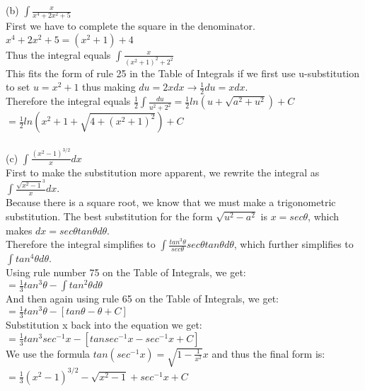\documentclass[11pt, oneside]{article}   	%
\begin{document}
\noindent (b) $\int \frac{x}{x^4 + 2x^2 + 5}$\\
First we have to complete the square in the denominator.\\
$x^4 + 2x^2 + 5 = (x^2 + 1) + 4$\\
Thus the integral equals $\int \frac{x}{(x^2+1)^2 + 2^2}$\\
This fits the form of rule 25 in the Table of Integrals if we first use u-substitution to set $u = x^2 + 1$ thus making $du = 2xdx \rightarrow \frac{1}{2}du = xdx$.\\
Therefore the integral equals $\frac{1}{2} \int \frac{du}{u^2 + 2^2} = \frac{1}{2} ln(u + \sqrt{a^2 + u^2}) + C$\\
$= \frac{1}{2} ln(x^2 + 1 + \sqrt{4 + (x^2+1)^2}) + C$\\~\\

\noindent (c) $\int \frac{(x^2-1)^{3/2}}{x}dx$\\
First to make the substitution more apparent, we rewrite the integral as $\int \frac{\sqrt{x^2-1}^3}{x}dx$.\\
Because there is a square root, we know that we must make a trigonometric substitution. The best substitution for the form $\sqrt{u^2-a^2}$ is $x = sec\theta$, which makes $dx = sec\theta tan\theta d\theta$.\\
Therefore the integral simplifies to $\int \frac{tan^3\theta}{sec\theta}sec\theta tan\theta d\theta$, which further simplifies to $\int tan^4\theta d\theta$.\\
Using rule number 75 on the Table of Integrals, we get:\\
$ = \frac{1}{3}tan^3\theta - \int tan^2\theta d\theta$\\
And then again using rule 65 on the Table of Integrals, we get:\\
$ = \frac{1}{3}tan^3\theta - [tan\theta - \theta + C]$\\
Substitution x back into the equation we get:\\
$ = \frac{1}{3}tan^3 sec^{-1} x - [tan sec^{-1} x - sec^{-1} x + C]$\\
We use the formula $tan(sec^{-1}x) = \sqrt{1 - \frac{1}{x^2}}x$ and thus the final form is:\\
$ = \frac{1}{3}(x^2-1)^{3/2} - \sqrt{x^2 - 1} + sec^{-1}x + C$\\
\end{document}
